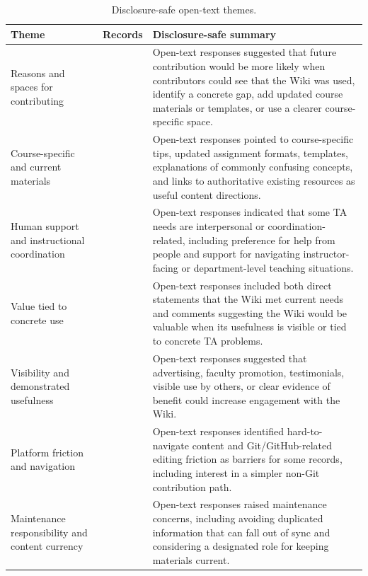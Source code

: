 \documentclass[11pt]{article}
\begin{document}
\begin{table}[H]
\centering
\renewcommand{\arraystretch}{1.08}
\footnotesize
\caption{Disclosure-safe open-text themes.}
\begin{tabular}{@{}>{\raggedright\arraybackslash}p{}@{\hspace{0.012\textwidth}}>{\raggedright\arraybackslash}p{}@{\hspace{0.012\textwidth}}>{\raggedright\arraybackslash}p{}@{}}
\toprule
Theme & Records & Disclosure-safe summary
\\
\midrule
Reasons and spaces for contributing & 6 & Open-text responses suggested that future contribution would be more likely when contributors could see that the Wiki was used, identify a concrete gap, add updated course materials or templates, or use a clearer course-specific space.
\\
Course-specific and current materials & 5 & Open-text responses pointed to course-specific tips, updated assignment formats, templates, explanations of commonly confusing concepts, and links to authoritative existing resources as useful content directions.
\\
Human support and instructional coordination & 5 & Open-text responses indicated that some TA needs are interpersonal or coordination-related, including preference for help from people and support for navigating instructor-facing or department-level teaching situations.
\\
Value tied to concrete use & 5 & Open-text responses included both direct statements that the Wiki met current needs and comments suggesting the Wiki would be valuable when its usefulness is visible or tied to concrete TA problems.
\\
Visibility and demonstrated usefulness & 4 & Open-text responses suggested that advertising, faculty promotion, testimonials, visible use by others, or clear evidence of benefit could increase engagement with the Wiki.
\\
Platform friction and navigation & 3 & Open-text responses identified hard-to-navigate content and Git/GitHub-related editing friction as barriers for some records, including interest in a simpler non-Git contribution path.
\\
Maintenance responsibility and content currency & 2 & Open-text responses raised maintenance concerns, including avoiding duplicated information that can fall out of sync and considering a designated role for keeping materials current.
\\
\bottomrule
\end{tabular}
\normalsize
\end{table}
\end{document}
